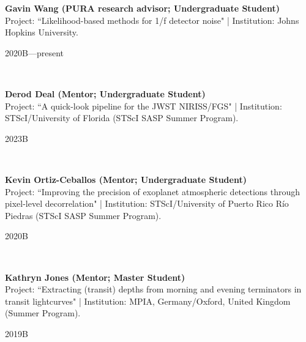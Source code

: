 \documentclass[12pt, a4paper]{article} %
\begin{document}
\begin{minipage}[t]{0.7\textwidth}
\begin{flushleft}%
  \setlength{\leftskip}{0.2cm}%
\textbf{Gavin Wang (PURA research advisor; Undergraduate Student)}\\
Project: ``Likelihood-based methods for 1/f detector noise" | Institution: Johns Hopkins University.
\end{flushleft}
\end{minipage}
\begin{minipage}[t]{0.3\textwidth}
\hfill 2020B---present
\end{minipage}\\

\begin{minipage}[t]{0.7\textwidth}
\begin{flushleft}%
  \setlength{\leftskip}{0.2cm}%
\textbf{Derod Deal (Mentor; Undergraduate Student)}\\
Project: ``A quick-look pipeline for the JWST NIRISS/FGS" | Institution: STScI/University of Florida (STScI SASP Summer Program).
\end{flushleft}
\end{minipage}
\begin{minipage}[t]{0.3\textwidth}
\hfill 2023B
\end{minipage}\\

\begin{minipage}[t]{0.7\textwidth}
\begin{flushleft}%
  \setlength{\leftskip}{0.2cm}%
\textbf{Kevin Ortiz-Ceballos (Mentor; Undergraduate Student)}\\
Project: ``Improving the precision of exoplanet atmospheric detections through pixel-level decorrelation" | Institution: STScI/University of Puerto Rico Río Piedras (STScI SASP Summer Program).
\end{flushleft}
\end{minipage}
\begin{minipage}[t]{0.3\textwidth}
\hfill 2020B
\end{minipage}\\

\begin{minipage}[t]{0.7\textwidth}
\begin{flushleft}%
  \setlength{\leftskip}{0.2cm}%
\textbf{Kathryn Jones (Mentor; Master Student)}\\
Project: ``Extracting (transit) depths from morning and evening terminators in transit lightcurves" | Institution: MPIA, Germany/Oxford, United Kingdom (Summer Program).
\end{flushleft}
\end{minipage}
\begin{minipage}[t]{0.3\textwidth}
\hfill 2019B
\end{minipage}\\
\end{document}
